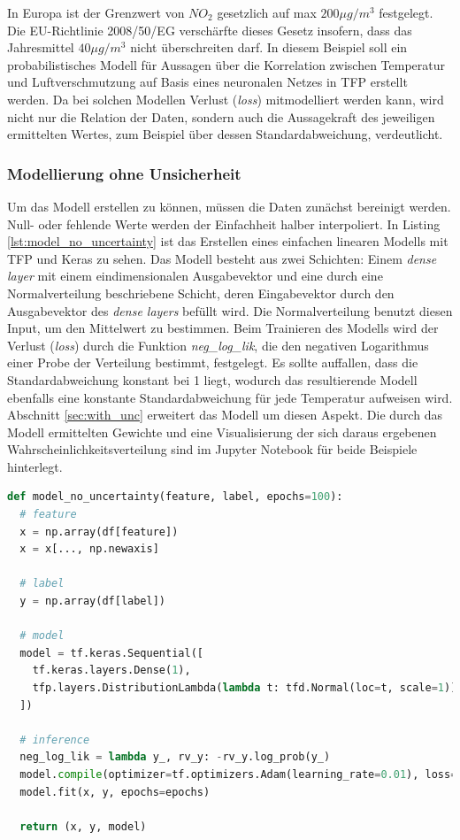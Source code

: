 \documentclass[12pt]{article}
\begin{document}
In Europa ist der Grenzwert von $NO_2$ gesetzlich auf max $200{\mu g/m^3}$ festgelegt. Die EU-Richtlinie 2008/50/EG verschärfte dieses Gesetz insofern, dass das Jahresmittel $40{\mu g/m^3}$ nicht überschreiten darf. In diesem Beispiel soll ein probabilistisches Modell für Aussagen über die Korrelation zwischen Temperatur und Luftverschmutzung auf Basis eines neuronalen Netzes in TFP erstellt werden. Da bei solchen Modellen Verlust (\textit{loss}) mitmodelliert werden kann, wird nicht nur die Relation der Daten, sondern auch die Aussagekraft des jeweiligen ermittelten Wertes, zum Beispiel über dessen Standardabweichung, verdeutlicht.

\subsubsection{Modellierung ohne Unsicherheit}
\label{sec:no_unc}

Um das Modell erstellen zu können, müssen die Daten zunächst bereinigt werden. Null- oder fehlende Werte werden der Einfachheit halber interpoliert. In Listing \ref{lst:model_no_uncertainty} ist das Erstellen eines einfachen linearen Modells mit TFP und Keras zu sehen. Das Modell besteht aus zwei Schichten: Einem \textit{dense layer} mit einem eindimensionalen Ausgabevektor und eine durch eine Normalverteilung beschriebene Schicht, deren Eingabevektor durch den Ausgabevektor des \textit{dense layers} befüllt wird. Die Normalverteilung benutzt diesen Input, um den Mittelwert zu bestimmen. Beim Trainieren des Modells wird der Verlust (\textit{loss}) durch die Funktion \textit{neg\_log\_lik}, die den negativen Logarithmus einer Probe der Verteilung bestimmt, festgelegt. Es sollte auffallen, dass die Standardabweichung konstant bei 1 liegt, wodurch das resultierende Modell ebenfalls eine konstante Standardabweichung für jede Temperatur aufweisen wird. Abschnitt \ref{sec:with_unc} erweitert das Modell um diesen Aspekt. Die durch das Modell ermittelten Gewichte und eine Visualisierung der sich daraus ergebenen Wahrscheinlichkeitsverteilung sind im Jupyter Notebook für beide Beispiele hinterlegt.

\begin{lstlisting}[language=Python, caption={Modell mit Keras ohne Unsicherheit}, label={lst:model_no_uncertainty}]
def model_no_uncertainty(feature, label, epochs=100):
  # feature
  x = np.array(df[feature])
  x = x[..., np.newaxis]

  # label
  y = np.array(df[label])
  
  # model
  model = tf.keras.Sequential([
    tf.keras.layers.Dense(1),
    tfp.layers.DistributionLambda(lambda t: tfd.Normal(loc=t, scale=1)),
  ])

  # inference
  neg_log_lik = lambda y_, rv_y: -rv_y.log_prob(y_)
  model.compile(optimizer=tf.optimizers.Adam(learning_rate=0.01), loss=neg_log_lik)
  model.fit(x, y, epochs=epochs)
  
  return (x, y, model)
\end{lstlisting}
\end{document}
